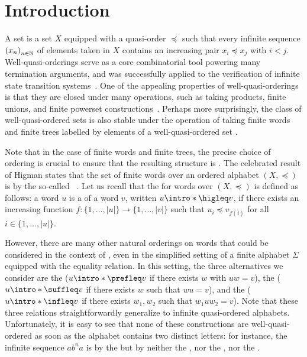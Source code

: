 \section{Introduction}
\label{introduction:sec}

\AP A  set is a set $X$ equipped with a quasi-order
$\preceq$ such that every infinite sequence $\seqof{x_n}$ of elements taken in
$X$ contains an increasing pair $x_i \preceq x_j$ with $i < j$. Well-quasi-orderings serve
as a core combinatorial tool powering many termination arguments, and was
successfully applied to the verification of infinite state transition
systems~\cite{ABDU96,ABDU98}. One of the appealing properties of
well-quasi-orderings is that they are closed under many operations, such as
taking products, finite unions, and finite powerset
constructions~\cite{SCSC12}. Perhaps more surprisingly, the class of
well-quasi-ordered sets is also stable under the operation of taking finite
words and finite trees labelled by elements of a well-quasi-ordered set
\cite{HIG52,KRU72}.

\AP Note that in the case of finite words and finite trees, the precise choice
of ordering is crucial to ensure that the resulting structure is
. The celebrated result of Higman states that the set of
finite words over an ordered alphabet $(X, \preceq)$ is 
by the so-called ~\cite{HIG52}. Let us recall
that the  for words over $(X, \preceq)$ is defined as
follows: a word $u$ is a  of a word $v$, written $u
\intro*\higleq v$, if there exists an increasing function $f \colon \{1,
\ldots, |u|\} \to \{1, \ldots, |v|\}$ such that $u_i \preceq v_{f(i)}$ for all
$i \in \{1, \ldots, |u|\}$.

\AP However, there are many other natural orderings on words that could be
considered in the context of , even in the simplified
setting of a finite alphabet $\Sigma$ equipped with the equality relation. In
this setting, the three alternatives we consider are the  ($u \intro*\prefleq v$ if there exists $w$ with $uw = v$), the
 ($u \intro*\suffleq v$ if there exists $w$ such that
$wu = v$), and the  ($u \intro*\infleq v$ if there exists
$w_1,w_2$ such that $w_1 u w_2 = v$). Note that these three relations
straightforwardly generalize to infinite quasi-ordered alphabets.
Unfortunately, it is easy to see that none of these constructions are 
well-quasi-ordered as soon as the alphabet contains two distinct letters:
for instance, the infinite sequence $a b^n a$ is  by
the  but by neither the , nor the
, nor the .

